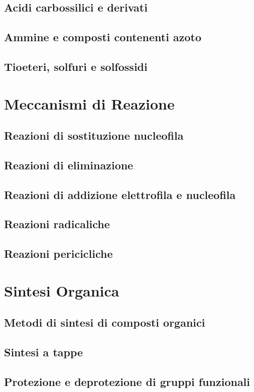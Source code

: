 \subsection{Acidi carbossilici e derivati}
\subsection{Ammine e composti contenenti azoto}
\subsection{Tioeteri, solfuri e solfossidi}

\section{Meccanismi di Reazione}
\subsection{Reazioni di sostituzione nucleofila}
\subsection{Reazioni di eliminazione}
\subsection{Reazioni di addizione elettrofila e nucleofila}
\subsection{Reazioni radicaliche}
\subsection{Reazioni pericicliche}

\section{Sintesi Organica}
\subsection{Metodi di sintesi di composti organici}
\subsection{Sintesi a tappe}
\subsection{Protezione e deprotezione di gruppi funzionali}
